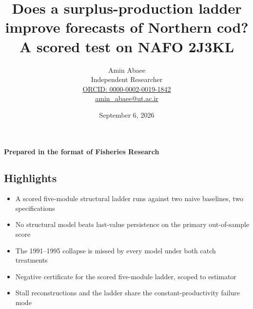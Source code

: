 \documentclass[11pt]{article}
\providecommand{\tightlist}{\setlength{\itemsep}{0pt}\setlength{\parskip}{0pt}}
\begin{document}
\title{Does a surplus-production ladder improve forecasts of Northern cod? A scored test on NAFO 2J3KL}
\author{Amin Abaee\\[0.35em]
{\small Independent Researcher}\\[0.55em]
{\small\href{https://orcid.org/0000-0002-0019-1842}{ORCID: 0000-0002-0019-1842}}\\[0.3em]
{\small\href{mailto:amin\_abaee@ut.ac.ir}{amin\_abaee@ut.ac.ir}}}
\date{September 6, 2026}
\maketitle

{\centering\small \textbf{Prepared in the format of Fisheries Research}\par}

\subsection{Highlights}\label{highlights}

\begin{itemize}
\tightlist
\item
  A scored five-module structural ladder runs against two naive
  baselines, two specifications
\item
  No structural model beats last-value persistence on the primary
  out-of-sample score
\item
  The 1991--1995 collapse is missed by every model under both catch
  treatments
\item
  Negative certificate for the scored five-module ladder, scoped to
  estimator
\item
  Stall reconstructions and the ladder share the constant-productivity
  failure mode
\end{itemize}
\end{document}
